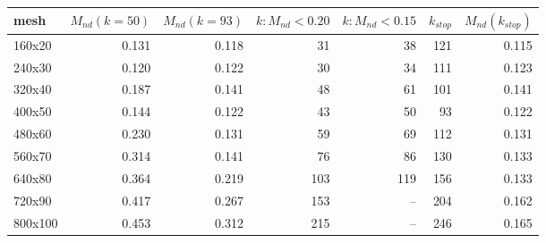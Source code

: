 \setlength{\tabcolsep}{3.5pt}
\begin{tabular}{lrrrrrr}
\toprule
mesh & $M_{nd}(k{=}50)$ & $M_{nd}(k{=}93)$ & $k: M_{nd}<0.20$ & $k: M_{nd}<0.15$ & $k_{stop}$ & $M_{nd}(k_{stop})$ \\
\midrule
160x20 & 0.131 & 0.118 & 31 & 38 & 121 & 0.115 \\
240x30 & 0.120 & 0.122 & 30 & 34 & 111 & 0.123 \\
320x40 & 0.187 & 0.141 & 48 & 61 & 101 & 0.141 \\
400x50 & 0.144 & 0.122 & 43 & 50 & 93 & 0.122 \\
480x60 & 0.230 & 0.131 & 59 & 69 & 112 & 0.131 \\
560x70 & 0.314 & 0.141 & 76 & 86 & 130 & 0.133 \\
640x80 & 0.364 & 0.219 & 103 & 119 & 156 & 0.133 \\
720x90 & 0.417 & 0.267 & 153 & -- & 204 & 0.162 \\
800x100 & 0.453 & 0.312 & 215 & -- & 246 & 0.165 \\
\bottomrule
\end{tabular}
